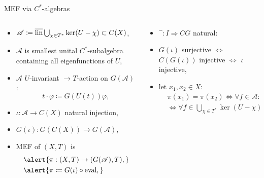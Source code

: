 \begin{frame}[fragile]{MEF via $C^*$-algebras}
  \begin{columns}[t]
    \begin{column}{0.5\textwidth}
     \begin{itemize}
       \item $\mathscr{A}\coloneq \overline{\operatorname{lin}} \bigcup_{\chi \in T^*} \ker (U- \chi) \subset C(X)$,
    \item  $\mathscr{A}$ is smallest unital $C^*$-subalgebra containing all eigenfunctions of $U$,
   \item \pause
      $\mathscr{A}$ $U$-invariant $\rightarrow T$-action on $G(\mathscr{A})$:
      \begin{equation*}
      t\cdot \varphi \coloneq G(U(t))\varphi,
      \end{equation*}
    \item \pause $\iota : \mathscr{A} \to C(X)$ natural injection,
    \item $G(\iota)  : G(C(X)) \to G(\mathscr{A})$,
    \item \alert{MEF of $(X,T)$ is}
      \begin{equation*}
        \begin{split}
          &\alert{\pi : (X,T) \to (G(\mathscr{A}),T),}\\ 
          &\alert{\pi \coloneq G(\iota) \circ \ev,}
        \end{split}
      \end{equation*}
        \end{itemize}
    \end{column}
    \begin{column}{0.5 \textwidth}
 \begin{itemize}
 \item \pause $\widehat{\phantom{a}}: I \Rightarrow CG$ natural:
   \item \pause
          $G(\iota)$ surjective $\Leftrightarrow$ $C (G( \iota ))$ injective $\Leftrightarrow$ $\iota$ injective,
    \item \pause let $x_1, x_2 \in X$:
      \begin{equation*}
        \begin{split}
          &\pi (x_1) = \pi (x_2) \Leftrightarrow \forall f \in \mathscr{A} : f(x_1) = f(x_2) \\
          &\Leftrightarrow \forall f \in \bigcup_{\chi \in T^*} \ker (U- \chi)  : f(x_1) = f(x_2).
        \end{split}
    \end{equation*}
        \end{itemize}
    \end{column}
  \end{columns}
  \end{frame}
